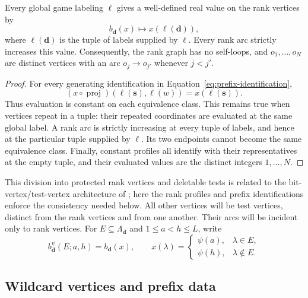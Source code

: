 \begin{lemma}
\label{lem:evaluation-invariant}
Every global game labeling $\ell$ gives a well-defined real value on the
rank vertices by
\[
  b_{\mathbf d}(x)\longmapsto x(\ell(\mathbf d)),
\]
where $\ell(\mathbf d)$ is the tuple of labels supplied by $\ell$.  Every
rank arc strictly increases this value.  Consequently, the rank graph has
no self-loops, and $o_1,\ldots,o_N$ are distinct vertices with an arc
$o_j\to o_{j'}$ whenever $j<j'$.
\end{lemma}

\begin{proof}
For every generating identification in
Equation~\eqref{eq:prefix-identification},
\[
  (x\circ\operatorname{proj})(\ell(\mathbf s),\ell(w))
  =x(\ell(\mathbf s)).
\]
Thus evaluation is constant on each equivalence class.  This remains true
when vertices repeat in a tuple: their repeated coordinates are evaluated
at the same global label.  A rank arc is strictly increasing at every tuple
of labels, and hence at the particular tuple supplied by $\ell$.  Its two
endpoints cannot become the same equivalence class.  Finally, constant
profiles all identify with their representatives at the empty tuple, and
their evaluated values are the distinct integers $1,\ldots,N$.
\end{proof}

This division into protected rank vertices and deletable tests is related
to the bit-vertex/test-vertex architecture of
\cite[Section~3.1.1]{Svensson2013}; here the rank profiles and prefix
identifications enforce the consistency needed below.
All other vertices will be test vertices, distinct from the rank vertices
and from one another.  Their arcs will be incident only to rank vertices.
For $E\subseteq\Lambda_{\mathbf d}$ and $1\le a<h\le L$, write
\[
  b_{\mathbf d}^{\psi}(E;a,h)=b_{\mathbf d}(x),\qquad
  x(\lambda)=
  \begin{cases}
    \psi(a),&\lambda\in E,\\
    \psi(h),&\lambda\notin E.
  \end{cases}
\]

\subsection{Wildcard vertices and prefix data}

